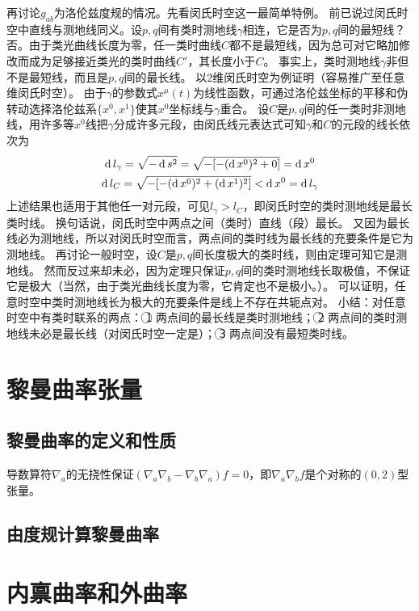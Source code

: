 再讨论$g_{ab}$为洛伦兹度规的情况。先看闵氏时空这一最简单特例。
前已说过闵氏时空中直线与测地线同义。设$p, q$间有类时测地线$\gamma$相连，它是否为$p, q$间的最短线？
否。由于类光曲线长度为零，任一类时曲线$C$都不是最短线，因为总可对它略加修改而成为足够接近类光的类时曲线$C'$，其长度小于$C$。
事实上，类时测地线$\gamma$非但不是最短线，而且是$p, q$间的最长线。
以$2$维闵氏时空为例证明（容易推广至任意维闵氏时空）。
由于$\gamma$的参数式$x^\mu(t)$为线性函数，可通过洛伦兹坐标的平移和伪转动选择洛伦兹系$\{x^0, x^1\}$使其$x^0$坐标线与$\gamma$重合。
设$C$是$p, q$间的任一类时非测地线，用许多等$x^0$线把$\gamma$分成许多元段，由闵氏线元表达式可知$\gamma$和$C$的元段的线长依次为
\begin{gather*}
\operatorname{d} l_\gamma = \sqrt{-\operatorname{d} s^2} = \sqrt{-[-(\operatorname{d} x^0)^2 + 0]} = \operatorname{d} x^0 \\
\operatorname{d} l_C = \sqrt{-[-(\operatorname{d} x^0)^2 + (\operatorname{d} x^1)^2]} < \operatorname{d} x^0 = \operatorname{d} l_\gamma
\end{gather*}
上述结果也适用于其他任一对元段，可见$l_\gamma > l_C$，即闵氏时空的类时测地线是最长类时线。
换句话说，闵氏时空中两点之间（类时）直线（段）最长。
又因为最长线必为测地线，所以对闵氏时空而言，两点间的类时线为最长线的充要条件是它为测地线。
再讨论一般时空，设$C$是$p, q$间长度极大的类时线，则由定理可知它是测地线。
然而反过来却未必，因为定理只保证$p, q$间的类时测地线长取极值，不保证它是极大（当然，由于类光曲线长度为零，它肯定也不是极小。）。
可以证明，任意时空中类时测地线长为极大的充要条件是线上不存在共轭点对。
小结：对任意时空中有类时联系的两点：
\textcircled{1} 两点间的最长线是类时测地线；
\textcircled{2} 两点间的类时测地线未必是最长线（对闵氏时空一定是）；
\textcircled{3} 两点间没有最短类时线。

\section{黎曼曲率张量}

\subsection{黎曼曲率的定义和性质}

导数算符$\nabla_a$的无挠性保证$(\nabla_a\nabla_b - \nabla_b\nabla_a)f = 0$，即$\nabla_a\nabla_bf$是个对称的$(0, 2)$型张量。


\subsection{由度规计算黎曼曲率}

\section{内禀曲率和外曲率}


